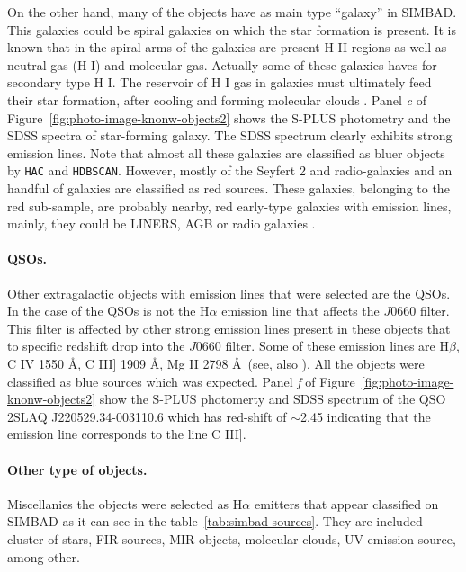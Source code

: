 \documentclass[fleqn,usenatbib]{mnras}
\begin{document}
On the other hand, many of the objects have as main type ``galaxy'' in SIMBAD.
This galaxies could be spiral galaxies on which the star formation is present. 
It is known that in the spiral arms of the galaxies are present H II regions 
as well as neutral gas (H I) and molecular gas. Actually some of these galaxies 
haves for secondary type H I. The reservoir of H I gas in galaxies must ultimately
feed their star formation, after cooling and forming molecular
clouds \citep{van-Driel:2016}. Panel \textit{c} of Figure~\ref{fig:photo-image-knonw-objects2} shows the 
S-PLUS photometry and the SDSS spectra of star-forming galaxy. The SDSS spectrum 
clearly exhibits strong emission lines. Note that almost all these galaxies are 
classified as bluer objects
by \texttt{HAC} and \texttt{HDBSCAN}.
However, mostly of the Seyfert 2 and radio-galaxies and an handful of 
galaxies are classified as red sources. 
These galaxies, belonging to the red sub-sample, are probably nearby, red early-type galaxies with emission lines, 
mainly, they could be LINERS, AGB or radio galaxies \citep{Capetti:2011}.

\paragraph{QSOs.}

Other extragalactic objects with emission lines that were selected are the
QSOs. In the case of the QSOs is not the H{$\alpha$} emission line that affects
 the $J$0660 filter. This filter is affected by other strong emission lines present in
these objects that to specific redshift drop into the $J$0660 filter.
Some of these emission lines are H{$\beta$}, C {\sc IV} 1550 \AA, C {\sc III]} 1909 \AA,
  Mg {\sc II} 2798 \AA~(see, also \citealp{Gutierrez:2020, Nakazono:2021}).
  All the objects were classified as blue sources which was expected. Panel \textit{f} of
  Figure~\ref{fig:photo-image-knonw-objects2} show the S-PLUS photomerty and SDSS 
  spectrum of the QSO 2SLAQ J220529.34-003110.6
  which has red-shift of $\sim$2.45 indicating that the emission line corresponds to
  the line C {\sc III]}.
  
\paragraph{Other type of objects.}
  
  Miscellanies the objects were selected as H{$\alpha$} emitters that appear classified on
  SIMBAD as it can see in the table~\ref{tab:simbad-sources}. They are included cluster of stars,
  FIR sources, MIR objects, molecular clouds, UV-emission source,  among other.
\end{document}
